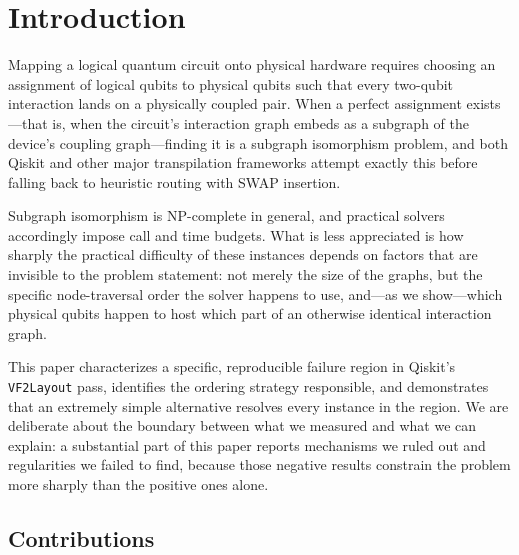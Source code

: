 \documentclass[11pt]{article}
\begin{document}
\section{Introduction}

Mapping a logical quantum circuit onto physical hardware requires
choosing an assignment of logical qubits to physical qubits such that
every two-qubit interaction lands on a physically coupled pair. When a
perfect assignment exists---that is, when the circuit's interaction
graph embeds as a subgraph of the device's coupling graph---finding it
is a subgraph isomorphism problem, and both Qiskit and other major
transpilation frameworks attempt exactly this before falling back to
heuristic routing with SWAP insertion.

Subgraph isomorphism is NP-complete in general, and practical solvers
accordingly impose call and time budgets. What is less appreciated is
how sharply the practical difficulty of these instances depends on
factors that are invisible to the problem statement: not merely the
size of the graphs, but the specific node-traversal order the solver
happens to use, and---as we show---which physical qubits happen to host
which part of an otherwise identical interaction graph.

This paper characterizes a specific, reproducible failure region in
Qiskit's \texttt{VF2Layout} pass, identifies the ordering strategy
responsible, and demonstrates that an extremely simple alternative
resolves every instance in the region. We are deliberate about the
boundary between what we measured and what we can explain: a
substantial part of this paper reports mechanisms we ruled out and
regularities we failed to find, because those negative results
constrain the problem more sharply than the positive ones alone.

\subsection{Contributions}
\end{document}
